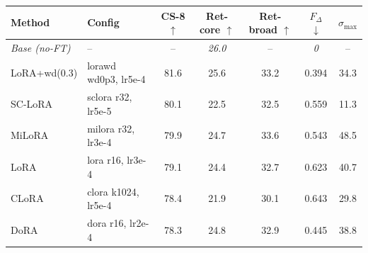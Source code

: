 \begin{tabular}{l l c c c c c}
\toprule
Method & Config & CS-8 $\uparrow$ & Ret-core $\uparrow$ & Ret-broad $\uparrow$ & $F_{\Delta}$ $\downarrow$ & $\sigma_{\max}$ \\
\midrule
\textit{Base (no-FT)} & -- & -- & \textit{26.0} & -- & \textit{0} & -- \\
\midrule
LoRA+wd(0.3) & lorawd wd0p3, lr5e-4 & 81.6 & 25.6 & 33.2 & 0.394 & 34.3 \\
SC-LoRA & sclora r32, lr5e-5 & 80.1 & 22.5 & 32.5 & 0.559 & 11.3 \\
MiLoRA & milora r32, lr3e-4 & 79.9 & 24.7 & 33.6 & 0.543 & 48.5 \\
LoRA & lora r16, lr3e-4 & 79.1 & 24.4 & 32.7 & 0.623 & 40.7 \\
CLoRA & clora k1024, lr5e-4 & 78.4 & 21.9 & 30.1 & 0.643 & 29.8 \\
DoRA & dora r16, lr2e-4 & 78.3 & 24.8 & 32.9 & 0.445 & 38.8 \\
\bottomrule
\end{tabular}
